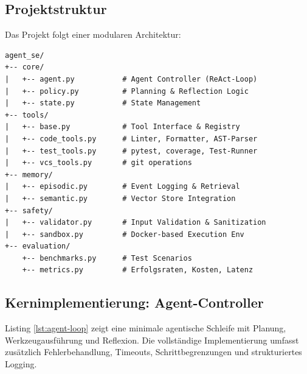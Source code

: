 \subsection{Projektstruktur}

Das Projekt folgt einer modularen Architektur:

\begin{lstlisting}[breaklines=true, basicstyle=\ttfamily\small]
agent_se/
+-- core/
|   +-- agent.py           # Agent Controller (ReAct-Loop)
|   +-- policy.py          # Planning & Reflection Logic
|   +-- state.py           # State Management
+-- tools/
|   +-- base.py            # Tool Interface & Registry
|   +-- code_tools.py      # Linter, Formatter, AST-Parser
|   +-- test_tools.py      # pytest, coverage, Test-Runner
|   +-- vcs_tools.py       # git operations
+-- memory/
|   +-- episodic.py        # Event Logging & Retrieval
|   +-- semantic.py        # Vector Store Integration
+-- safety/
|   +-- validator.py       # Input Validation & Sanitization
|   +-- sandbox.py         # Docker-based Execution Env
+-- evaluation/
    +-- benchmarks.py      # Test Scenarios
    +-- metrics.py         # Erfolgsraten, Kosten, Latenz
\end{lstlisting}

\subsection{Kernimplementierung: Agent-Controller}

Listing \ref{lst:agent-loop} zeigt eine minimale agentische Schleife mit Planung, Werkzeugausführung und Reflexion. Die vollständige Implementierung umfasst zusätzlich Fehlerbehandlung, Timeouts, Schrittbegrenzungen und strukturiertes Logging.

